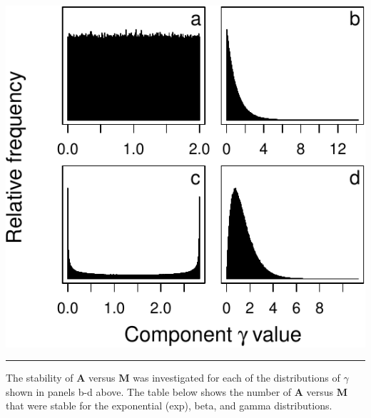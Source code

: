 \documentclass[]{article}
\begin{document}
\begin{center}\includegraphics{SI_files/figure-latex/unnamed-chunk-21-1} \end{center}

\begin{center}\rule{0.5\linewidth}{\linethickness}\end{center}

The stability of \(\mathbf{A}\) versus \(\mathbf{M}\) was investigated
for each of the distributions of \(\gamma\) shown in panels b-d above.
The table below shows the number of \(\mathbf{A}\) versus \(\mathbf{M}\)
that were stable for the exponential (exp), beta, and gamma
distributions.
\end{document}
